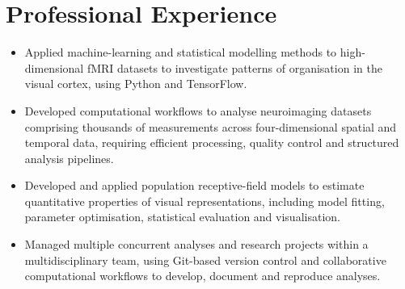 \documentclass[10pt,a4paper]{article}
\begin{document}





\section*{Professional Experience}


\begin{itemize}

    \item Applied machine-learning and statistical modelling methods to
    high-dimensional fMRI datasets to investigate patterns of organisation
    in the visual cortex, using Python and TensorFlow.

    \item Developed computational workflows to analyse neuroimaging datasets
    comprising thousands of measurements across four-dimensional spatial
    and temporal data, requiring efficient processing, quality control and
    structured analysis pipelines.

    \item Developed and applied population receptive-field models to
    estimate quantitative properties of visual representations, including
    model fitting, parameter optimisation, statistical evaluation and
    visualisation.

    \item Managed multiple concurrent analyses and research projects within
    a multidisciplinary team, using Git-based version control and
    collaborative computational workflows to develop, document and
    reproduce analyses.

\end{itemize}
\end{document}
